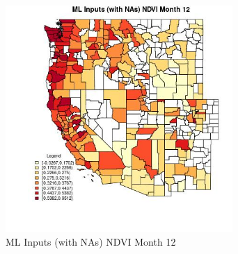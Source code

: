 \begin{figure} 
\centering  
\includegraphics[width=0.77\textwidth]{Code_Outputs/Report_ML_input_PM25_Step4_part_f_de_duplicated_aves_prioritize_24hr_obswNAs_CountyNDVImedianMonth12.jpg} 
\caption{\label{fig:Report_ML_input_PM25_Step4_part_f_de_duplicated_aves_prioritize_24hr_obswNAsCountyNDVImedianMonth12}ML Inputs (with NAs) NDVI Month 12} 
\end{figure} 
 
